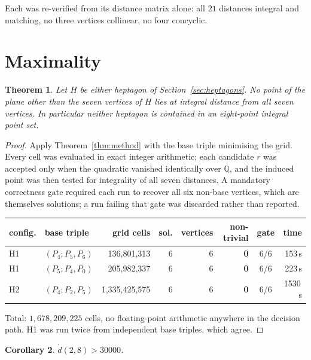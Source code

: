 \documentclass[11pt,reqno]{amsart}
\theoremstyle{plain}
\newtheorem{theorem}{Theorem}
\newtheorem{corollary}[theorem]{Corollary}
\numberwithin{equation}{section}
\newcommand{\dgp}{\dot{d}}
\begin{document}
Each was re-verified from its distance matrix alone: all $21$ distances integral and matching, no
three vertices collinear, no four concyclic.

\section{Maximality}\label{sec:maximality}

\begin{theorem}\label{thm:maximal}
Let $H$ be either heptagon of Section~\ref{sec:heptagons}. No point of the plane other than the seven
vertices of $H$ lies at integral distance from all seven vertices. In particular neither heptagon is
contained in an eight-point integral point set.
\end{theorem}

\begin{proof}
Apply Theorem~\ref{thm:method} with the base triple minimising the grid. Every cell was evaluated in
exact integer arithmetic; each candidate $r$ was accepted only when the quadratic vanished
identically over $\mathbb{Q}$, and the induced point was then tested for integrality of all seven
distances. A mandatory correctness gate required each run to recover all six non-base vertices, which
are themselves solutions; a run failing that gate was discarded rather than reported.

\begin{center}
\begin{tabular}{llrrrrcr}
\toprule
config. & base triple & grid cells & sol. & vertices & \textbf{non-trivial} & gate & time\\
\midrule
H1 & $(P_4;P_5,P_6)$ &   136{,}801{,}313 & 6 & 6 & \textbf{0} & 6/6 &  153\,s\\
H1 & $(P_5;P_4,P_0)$ &   205{,}982{,}337 & 6 & 6 & \textbf{0} & 6/6 &  223\,s\\
H2 & $(P_4;P_2,P_5)$ & 1{,}335{,}425{,}575 & 6 & 6 & \textbf{0} & 6/6 & 1530\,s\\
\bottomrule
\end{tabular}
\end{center}

Total: $1{,}678{,}209{,}225$ cells, no floating-point arithmetic anywhere in the decision path. H1 was
run twice from independent base triples, which agree.
\end{proof}

\begin{corollary}\label{cor:bound}
$\dgp(2,8)>30000$.
\end{corollary}
\end{document}

